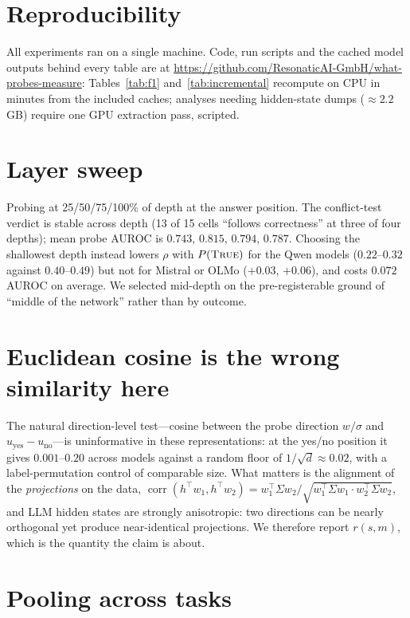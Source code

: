 \documentclass[10pt]{article}
\newcommand{\ptrue}{P(\textsc{True})}
\begin{document}
\section*{Reproducibility}

All experiments ran on a single machine. Code, run scripts and the cached model outputs behind
every table are at \url{https://github.com/ResonaticAI-GmbH/what-probes-measure}: Tables~\ref{tab:f1}
and~\ref{tab:incremental} recompute on CPU in minutes from the included caches; analyses needing
hidden-state dumps ($\approx 2.2$\,GB) require one GPU extraction pass, scripted.

\appendix
\section{Layer sweep}
\label{app:sweep}

Probing at 25/50/75/100\% of depth at the answer position. The conflict-test verdict is stable
across depth (13 of 15 cells ``follows correctness'' at three of four depths); mean probe AUROC is
$0.743$, $0.815$, $0.794$, $0.787$. Choosing the shallowest depth instead lowers $\rho$ with
$\ptrue{}$ for the Qwen models ($0.22$--$0.32$ against $0.40$--$0.49$) but not for Mistral or OLMo
($+0.03$, $+0.06$), and costs $0.072$ AUROC on average. We selected mid-depth on the
pre-registerable ground of ``middle of the network'' rather than by outcome.

\section{Euclidean cosine is the wrong similarity here}
\label{app:cosine}

The natural direction-level test---cosine between the probe direction $w/\sigma$ and
$u_{\text{yes}} - u_{\text{no}}$---is uninformative in these representations: at the yes/no position
it gives $0.001$--$0.20$ across models against a random floor of $1/\sqrt{d} \approx 0.02$, with a
label-permutation control of comparable size. What matters is the alignment of the \emph{projections}
on the data, $\operatorname{corr}(h^\top w_1, h^\top w_2) = w_1^\top \Sigma w_2 /
\sqrt{w_1^\top \Sigma w_1 \cdot w_2^\top \Sigma w_2}$, and LLM hidden states are strongly
anisotropic: two directions can be nearly orthogonal yet produce near-identical projections. We
therefore report $r(s,m)$, which is the quantity the claim is about.

\section{Pooling across tasks}
\label{app:pooling}
\end{document}
